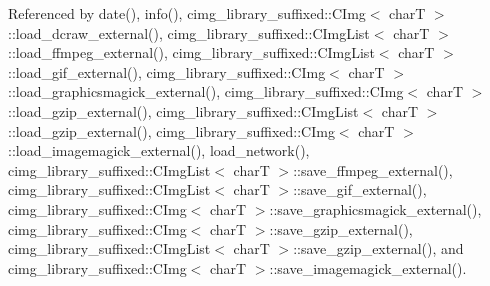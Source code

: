 Referenced by date(), info(), cimg\+\_\+library\+\_\+suffixed\+::\+C\+Img$<$ char\+T $>$\+::load\+\_\+dcraw\+\_\+external(), cimg\+\_\+library\+\_\+suffixed\+::\+C\+Img\+List$<$ char\+T $>$\+::load\+\_\+ffmpeg\+\_\+external(), cimg\+\_\+library\+\_\+suffixed\+::\+C\+Img\+List$<$ char\+T $>$\+::load\+\_\+gif\+\_\+external(), cimg\+\_\+library\+\_\+suffixed\+::\+C\+Img$<$ char\+T $>$\+::load\+\_\+graphicsmagick\+\_\+external(), cimg\+\_\+library\+\_\+suffixed\+::\+C\+Img$<$ char\+T $>$\+::load\+\_\+gzip\+\_\+external(), cimg\+\_\+library\+\_\+suffixed\+::\+C\+Img\+List$<$ char\+T $>$\+::load\+\_\+gzip\+\_\+external(), cimg\+\_\+library\+\_\+suffixed\+::\+C\+Img$<$ char\+T $>$\+::load\+\_\+imagemagick\+\_\+external(), load\+\_\+network(), cimg\+\_\+library\+\_\+suffixed\+::\+C\+Img\+List$<$ char\+T $>$\+::save\+\_\+ffmpeg\+\_\+external(), cimg\+\_\+library\+\_\+suffixed\+::\+C\+Img\+List$<$ char\+T $>$\+::save\+\_\+gif\+\_\+external(), cimg\+\_\+library\+\_\+suffixed\+::\+C\+Img$<$ char\+T $>$\+::save\+\_\+graphicsmagick\+\_\+external(), cimg\+\_\+library\+\_\+suffixed\+::\+C\+Img$<$ char\+T $>$\+::save\+\_\+gzip\+\_\+external(), cimg\+\_\+library\+\_\+suffixed\+::\+C\+Img\+List$<$ char\+T $>$\+::save\+\_\+gzip\+\_\+external(), and cimg\+\_\+library\+\_\+suffixed\+::\+C\+Img$<$ char\+T $>$\+::save\+\_\+imagemagick\+\_\+external().

